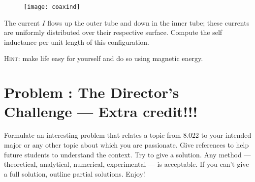 \documentclass[problems]{esg8022pset}
\begin{document}
  \begin{figure}[H]
    \centering
    \texttt{[image: coaxind]}
    \label{fig:coax}
  \end{figure}

  The current $I$ flows up the outer tube and down in the
  inner tube; these currents are uniformly distributed over their
  respective surface.  Compute the self inductance per unit length of
  this configuration.

  \noindent \textsc{Hint}: make life easy for yourself and do so using
  magnetic energy.
\section{Problem \thesection: The Director's Challenge --- Extra credit!!!}
  Formulate an interesting problem that relates a topic from 8.022 to your
  intended major or any other topic about which you are passionate.  Give
  references to help future students to understand the context.  Try to give a
  solution.  Any method --- theoretical, analytical, numerical, experimental
  --- is acceptable.  If you can't give a full solution, outline partial
  solutions. Enjoy!
\end{document}
